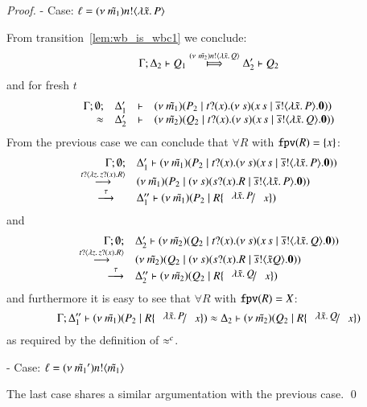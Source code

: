 \begin{proof}
	\noi - Case: $\ell = (\nu\ \tilde{m_1}) n ! \langle \lambda \tilde{x}.\,P \rangle$

	\noi From transition~\ref{lem:wb_is_wbc1} we conclude:
%
\[
	\horel{\Gamma}{\Delta_2}{Q_1}{\Hby{\news{\tilde{m_2}} \bactout{n}{\abs{\tilde{x}}{Q}}}}{\Delta_2'}{Q_2}
\]
%
	\noi and for fresh $t$
%
\[
	\begin{array}{rcll} \Gamma; \emptyset; &\Delta_1'& \vdash& (\nu\ \tilde{m_1})(P_2 \;|\; t ? (x) . (\nu\ s)(x\,s \;|\; \overline{s} ! \langle \lambda \tilde{x}.\,P \rangle . \mathbf{0}))\\ \approx &\Delta_2'& \vdash &  (\nu\ \tilde{m_2})(Q_2 \;|\; t ? (x) . (\nu\ s)(x\,s \;|\; \overline{s} ! \langle \lambda \tilde{x}.\,Q \rangle . \mathbf{0})) \end{array}
\]
%
	\noi From the  previous case we can conclude that $\forall R$ with $\mathtt{fpv}(R) = \{x\}$:
%
\[
	\begin{array}{rl}
		\Gamma; \es; &\Delta_1' \proves \newsp{\tilde{m_1}}{P_2 \Par \binp{t}{x} \newsp{s}{\appl{x}{s} \Par \bout{\dual{s}}{\abs{\tilde{x}}{P}} \inact}} \\
		\by{\bactinp{t}{\abs{z}{\binp{z}{x} R}}}& \newsp{\tilde{m_1}}{P_2 \Par \newsp{s}{\binp{s}{x} R \Par \bout{\dual{s}}{\abs{\tilde{x}}{P}} \inact}}\\
		\by{\tau} \quad &\Delta_1'' \proves \newsp{\tilde{m_1}}{P_2 \Par  R \subst{\abs{\tilde{x}}{P}}{x}}
	\end{array}
\]
%
	\noi and
%
\[
	\begin{array}{rl}
		\Gamma; \es; &\Delta_2' \proves \newsp{\tilde{m_2}}{Q_2 \Par \binp{t}{x} \newsp{s}{\appl{x}{s} \Par \bout{\dual{s}}{\abs{\tilde{x}}{Q}} \inact}} \\
		\by{\bactinp{t}{\abs{z}{\binp{z}{x} R}}} &\newsp{\tilde{m_2}}{Q_2 \Par \newsp{s}{\binp{s}{x} R \Par \bout{\dual{s}}{{\tilde{x}}{Q}} \inact}}\\
		\by{\tau} &\Delta_2'' \proves \newsp{\tilde{m_2}}{Q_2 \Par  R \subst{\abs{\tilde{x}}{Q}}{x}}
	\end{array}
\]
%
	\noi and furthermore it is easy to see that $\forall R$ with $\mathtt{fpv}(R) = X$:
%
\[
	\horel{\Gamma}{\Delta_1''}{\newsp{\tilde{m_1}}{P_2 \Par  R \subst{\abs{\tilde{x}}{P}}{x}}}{\wb}{\Delta_2}{\newsp{\tilde{m_2}}{Q_2 \Par R \subst{\abs{\tilde{x}}{Q}}{x}}}
\]
%
	\noi as required by the definition of $\approx^{c}$.

	\noi - Case: $\ell = (\nu\ \tilde{m_1}') n ! \langle \tilde{m_1} \rangle$

	The last case shares a similar argumentation with the previous case.
	\qed
\end{proof}



